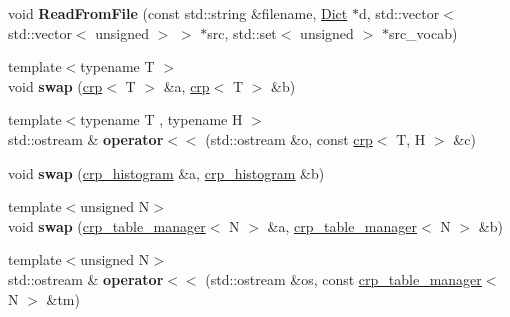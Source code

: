 \begin{DoxyCompactItemize}
\item 
\mbox{\label{namespacecpyp_a12034b4e270d9949da9dfa80fa7ddbd5}} 
void {\bfseries Read\+From\+File} (const std\+::string \&filename, \mbox{\hyperlink{classcpyp_1_1_dict}{Dict}} $\ast$d, std\+::vector$<$ std\+::vector$<$ unsigned $>$ $>$ $\ast$src, std\+::set$<$ unsigned $>$ $\ast$src\+\_\+vocab)
\item 
\mbox{\label{namespacecpyp_a5df2edbcf626e121611b105a6c0ba1ed}} 
{\footnotesize template$<$typename T $>$ }\\void {\bfseries swap} (\mbox{\hyperlink{classcpyp_1_1crp}{crp}}$<$ T $>$ \&a, \mbox{\hyperlink{classcpyp_1_1crp}{crp}}$<$ T $>$ \&b)
\item 
\mbox{\label{namespacecpyp_aac3dd4659a276099eeb0114b74cfbe1d}} 
{\footnotesize template$<$typename T , typename H $>$ }\\std\+::ostream \& {\bfseries operator$<$$<$} (std\+::ostream \&o, const \mbox{\hyperlink{classcpyp_1_1crp}{crp}}$<$ T, H $>$ \&c)
\item 
\mbox{\label{namespacecpyp_a0d749471dd91045c326ea6cc30333b4e}} 
void {\bfseries swap} (\mbox{\hyperlink{structcpyp_1_1crp__histogram}{crp\+\_\+histogram}} \&a, \mbox{\hyperlink{structcpyp_1_1crp__histogram}{crp\+\_\+histogram}} \&b)
\item 
\mbox{\label{namespacecpyp_a9de052e982daf158893170400e3b3ffe}} 
{\footnotesize template$<$unsigned N$>$ }\\void {\bfseries swap} (\mbox{\hyperlink{structcpyp_1_1crp__table__manager}{crp\+\_\+table\+\_\+manager}}$<$ N $>$ \&a, \mbox{\hyperlink{structcpyp_1_1crp__table__manager}{crp\+\_\+table\+\_\+manager}}$<$ N $>$ \&b)
\item 
\mbox{\label{namespacecpyp_ab51248757b2797f689aa4104a1db8f2b}} 
{\footnotesize template$<$unsigned N$>$ }\\std\+::ostream \& {\bfseries operator$<$$<$} (std\+::ostream \&os, const \mbox{\hyperlink{structcpyp_1_1crp__table__manager}{crp\+\_\+table\+\_\+manager}}$<$ N $>$ \&tm)
\item 
\mbox{\label{namespacecpyp_a318ff609d6b3dd1992abc03e7aa9b151}} 

\end{DoxyCompactItemize}
